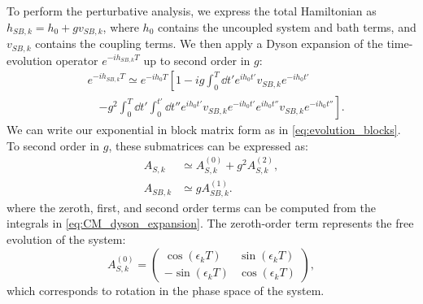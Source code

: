 To perform the perturbative analysis, we express the total Hamiltonian as $h_{SB,k} = h_0 + g v_{SB,k}$, where $h_0$ contains the uncoupled system and bath terms, and $v_{SB,k}$ contains the coupling terms. We then apply a Dyson expansion of the time-evolution operator $e^{-i h_{SB,k} T}$ up to second order in $g$:
\begin{align}
    \label{eq:CM_dyson_expansion}
     &e^{-i h_{SB,k} T} \simeq e^{-i h_0 T} \left[ 1 - i g \int_0^T  \dd t' e^{i h_0 t'} v_{SB,k} e^{-i h_0 t'} \right. \nonumber\\
     &\quad \left. - g^2 \int_0^T  \dd t' \int_0^{t'}  \dd t'' e^{i h_0 t'} v_{SB,k} e^{-i h_0 t'} e^{i h_0 t''} v_{SB,k} e^{-i h_0 t''} \right].
\end{align}
We can write our exponential in block matrix form as in \cref{eq:evolution_blocks}. To second order in $g$, these submatrices can be expressed as:
\begin{align}
    A_{S,k}  &\simeq A_{S,k}^{(0)} + g^2 A_{S,k}^{(2)}, \label{eq:As_expansion}\\
    A_{SB,k} &\simeq g A_{SB,k}^{(1)}. \label{eq:Asb_expansion}
\end{align}
where the zeroth, first, and second order terms can be computed from the integrals in \cref{eq:CM_dyson_expansion}. The zeroth-order term represents the free evolution of the system:
\begin{equation}
    \label{eq:As0}
    A_{S,k}^{(0)} = \begin{pmatrix}
        \cos(\epsilon_k T)  &\sin(\epsilon_k T)\\
        -\sin(\epsilon_k T) &\cos(\epsilon_k T)
    \end{pmatrix},
\end{equation}
which corresponds to rotation in the phase space of the system.

